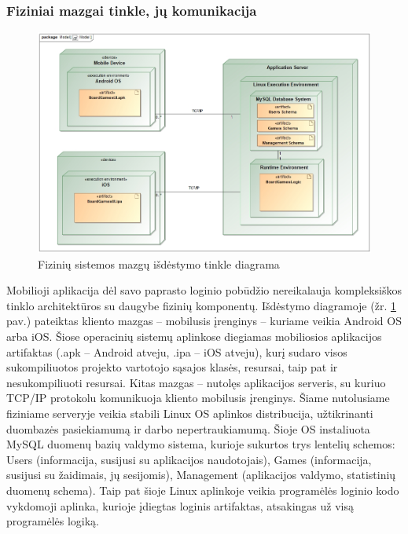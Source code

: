 \documentclass{VUMIFPSkursinis}
\begin{document}
	\subsubsection{Fiziniai mazgai tinkle, jų komunikacija}
				\begin{figure}[H]
				\centering
				\includegraphics[scale=0.5]{img/NodesCommunication}
				\caption{Fizinių sistemos mazgų išdėstymo tinkle diagrama}
				\label{img:NodesCommunication}
			\end{figure}
			Mobilioji aplikacija dėl savo paprasto loginio pobūdžio nereikalauja 				kompleksiškos tinklo architektūros su daugybe fizinių komponentų. 				Išdėstymo diagramoje (žr. \ref{img:NodesCommunication} pav.)  pateiktas kliento mazgas – mobilusis įrenginys – 				kuriame veikia Android OS arba iOS. Šiose operacinių sistemų aplinkose 				diegiamas mobiliosios aplikacijos artifaktas (.apk – Android atveju, .ipa 				– iOS atveju), kurį sudaro visos sukompiliuotos projekto vartotojo sąsajos 				klasės, resursai, taip pat ir nesukompiliuoti resursai. Kitas mazgas – 				nutolęs aplikacijos serveris, su kuriuo TCP/IP protokolu komunikuoja kliento mobilusis įrenginys. Šiame nutolusiame fiziniame serveryje veikia stabili Linux OS 				aplinkos distribucija, užtikrinanti duombazės pasiekiamumą ir darbo 				nepertraukiamumą. Šioje OS instaliuota MySQL duomenų bazių valdymo 				sistema, kurioje sukurtos trys lentelių schemos: Users (informacija, 				susijusi su aplikacijos naudotojais), Games (informacija, susijusi su 				žaidimais, jų sesijomis), Management (aplikacijos valdymo, statistinių 				duomenų schema). Taip pat šioje Linux aplinkoje veikia programėlės loginio 				kodo vykdomoji aplinka, kurioje įdiegtas loginis artifaktas, atsakingas už 				visą programėlės logiką.
\end{document}
